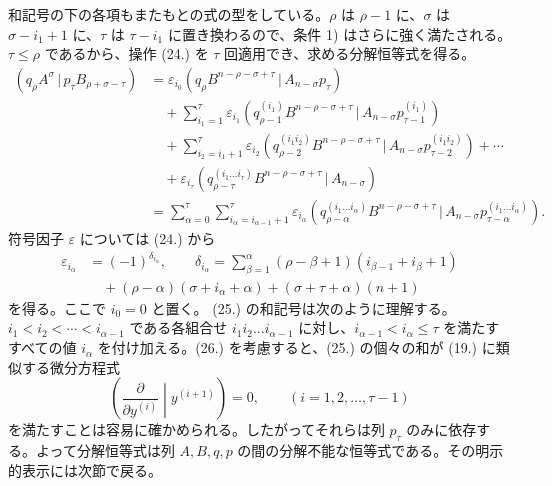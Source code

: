\documentclass[11pt]{article}
\newcommand{\pair}[2]{(#1\,|\,#2)}
\newcommand{\eps}{\varepsilon}
\begin{document}
和記号の下の各項もまたもとの式の型をしている。$\rho$ は $\rho-1$ に、$\sigma$ は $\sigma-i_1+1$ に、$\tau$ は $\tau-i_1$ に置き換わるので、条件 1) はさらに強く満たされる。$\tau\le\rho$ であるから、操作 (24.) を $\tau$ 回適用でき、求める分解恒等式を得る。
\begin{equation}
\begin{aligned}
\pair{q_\rho A^\sigma}{p_\tau B_{\rho+\sigma-\tau}}
&=\eps_{i_0}\pair{q_\rho B^{n-\rho-\sigma+\tau}}{A_{n-\sigma}p_\tau}\\
&\quad+\sum_{i_1=1}^{\tau}\eps_{i_1}
 \pair{q_{\rho-1}^{(i_1)}B^{n-\rho-\sigma+\tau}}{A_{n-\sigma}p_{\tau-1}^{(i_1)}}\\
&\quad+\sum_{i_2=i_1+1}^{\tau}\eps_{i_2}
 \pair{q_{\rho-2}^{(i_1i_2)}B^{n-\rho-\sigma+\tau}}{A_{n-\sigma}p_{\tau-2}^{(i_1i_2)}}+\cdots\\
&\quad+\eps_{i_\tau}\pair{q_{\rho-\tau}^{(i_1\ldots i_\tau)}B^{n-\rho-\sigma+\tau}}{A_{n-\sigma}}\\
&=\sum_{\alpha=0}^{\tau}\sum_{i_\alpha=i_{\alpha-1}+1}^{\tau}\eps_{i_\alpha}
 \pair{q_{\rho-\alpha}^{(i_1\ldots i_\alpha)}B^{n-\rho-\sigma+\tau}}{A_{n-\sigma}p_{\tau-\alpha}^{(i_1\ldots i_\alpha)}}.
\end{aligned}
\tag{25}
\end{equation}
符号因子 $\eps$ については (24.) から
\begin{equation}
\begin{aligned}
\eps_{i_\alpha}&=(-1)^{\delta_{i_\alpha}},\qquad
\delta_{i_\alpha}=\sum_{\beta=1}^{\alpha}(\rho-\beta+1)(i_{\beta-1}+i_\beta+1)\\
&\quad +(\rho-\alpha)(\sigma+i_\alpha+\alpha)+(\sigma+\tau+\alpha)(n+1)
\end{aligned}
\tag{26}
\end{equation}
を得る。ここで $i_0=0$ と置く。 (25.) の和記号は次のように理解する。$i_1<i_2<\cdots<i_{\alpha-1}$ である各組合せ $i_1i_2\ldots i_{\alpha-1}$ に対し、$i_{\alpha-1}<i_\alpha\le\tau$ を満たすすべての値 $i_\alpha$ を付け加える。(26.) を考慮すると、(25.) の個々の和が (19.) に類似する微分方程式
\begin{equation}
 \left(\frac{\partial}{\partial y^{(i)}}\middle|y^{(i+1)}\right)=0,
 \qquad (i=1,2,\ldots,\tau-1)
\tag{27}
\end{equation}
を満たすことは容易に確かめられる。したがってそれらは列 $p_\tau$ のみに依存する。よって分解恒等式は列 $A,B,q,p$ の間の分解不能な恒等式である。その明示的表示には次節で戻る。
\end{document}
